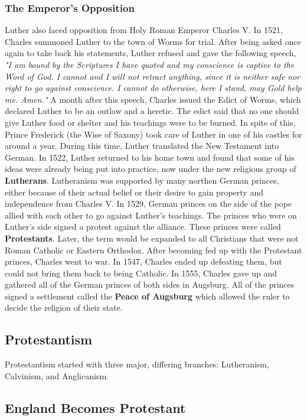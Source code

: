 \documentclass[11pt]{article}
\begin{document}
\subsubsection{The Emperor's Opposition}
\label{sec:orgea88548}
Luther also faced opposition from Holy Roman Emperor Charles V. In 1521, Charles summoned Luther to the town of Worms for trial. After being asked once again to take back his statements, Luther refused and gave the following speech, \emph{"I am bound by the Scriptures I have quoted and my conscience is captive to the Word of God. I cannot and I will not retract anything, since it is neither safe nor right to go against conscience. I cannot do otherwise, here I stand, may Gold help me. Amen."} A month after this speech, Charles issued the Edict of Worms, which declared Luther to be an outlaw and a heretic. The edict said that no one should give Luther food or shelter and his teachings were to be burned. In spite of this, Prince Frederick (the Wise of Saxony) took care of Luther in one of his castles for around a year. During this time, Luther translated the New Testament into German. In 1522, Luther returned to his home town and found that some of his ideas were already being put into practice, now under the new religious group of \textbf{Lutherans}. Lutheranism was supported by many northen German princes, either because of their actual belief or their desire to gain property and independence from Charles V. In 1529, German princes on the side of the pope allied with each other to go against Luther's teachings. The princes who were on Luther's side signed a protest against the alliance. These princes were called \textbf{Protestants}. Later, the term would be expanded to all Christians that were not Roman Catholic or Eastern Orthodox. After becoming fed up with the Protestant princes, Charles went to war. In 1547, Charles ended up defeating them, but could not bring them back to being Catholic. In 1555, Charles gave up and gathered all of the German princes of both sides in Augsburg. All of the princes signed a settlement called the \textbf{Peace of Augsburg} which allowed the ruler to decide the religion of their state.
\subsection{Protestantism}
\label{sec:orgf6d45b9}
Protestantism started with three major, differing branches: Lutheranism, Calvinism, and Anglicanism.
\subsection{England Becomes Protestant}
\label{sec:org1797491}
\end{document}

